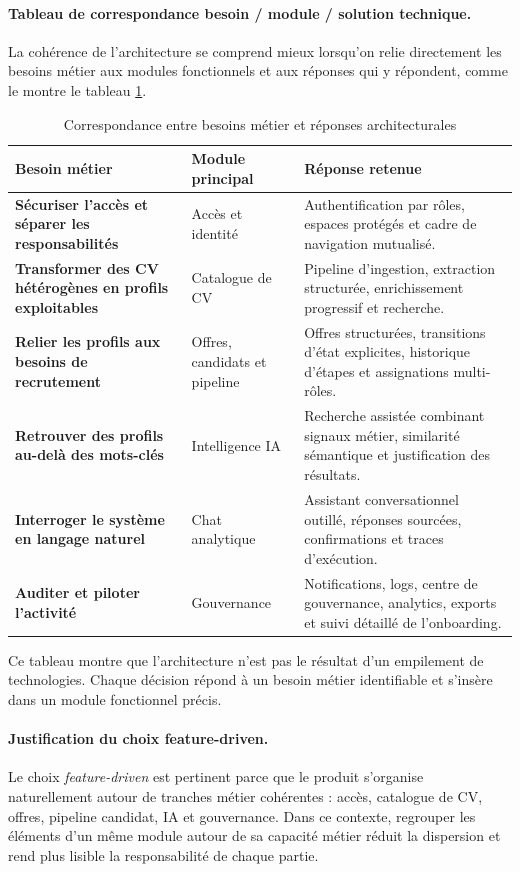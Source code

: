 \paragraph{Tableau de correspondance besoin / module / solution technique.}
La cohérence de l'architecture se comprend mieux lorsqu'on relie directement les besoins métier aux modules fonctionnels et aux réponses qui y répondent, comme le montre le tableau \ref{tab:business-architecture-correspondence}.

\begin{table}[H]
  \centering
  \caption{\label{tab:business-architecture-correspondence}Correspondance entre besoins métier et réponses architecturales}
  \begin{tabularx}{\textwidth}{>{\bfseries}p{3.1cm}p{3.1cm}X}
    \toprule
    Besoin métier & Module principal & Réponse retenue \\
    \midrule
    Sécuriser l'accès et séparer les responsabilités & Accès et identité & Authentification par rôles, espaces protégés et cadre de navigation mutualisé. \\
    Transformer des CV hétérogènes en profils exploitables & Catalogue de CV & Pipeline d'ingestion, extraction structurée, enrichissement progressif et recherche. \\
    Relier les profils aux besoins de recrutement & Offres, candidats et pipeline & Offres structurées, transitions d'état explicites, historique d'étapes et assignations multi-rôles. \\
    Retrouver des profils au-delà des mots-clés & Intelligence IA & Recherche assistée combinant signaux métier, similarité sémantique et justification des résultats. \\
    Interroger le système en langage naturel & Chat analytique & Assistant conversationnel outillé, réponses sourcées, confirmations et traces d'exécution. \\
    Auditer et piloter l'activité & Gouvernance & Notifications, logs, centre de gouvernance, analytics, exports et suivi détaillé de l'onboarding. \\
    \bottomrule
  \end{tabularx}
\end{table}

Ce tableau montre que l'architecture n'est pas le résultat d'un empilement de technologies. Chaque décision répond à un besoin métier identifiable et s'insère dans un module fonctionnel précis.

\paragraph{Justification du choix feature-driven.}
Le choix \textit{feature-driven} est pertinent parce que le produit s'organise naturellement autour de tranches métier cohérentes : accès, catalogue de CV, offres, pipeline candidat, IA et gouvernance. Dans ce contexte, regrouper les éléments d'un même module autour de sa capacité métier réduit la dispersion et rend plus lisible la responsabilité de chaque partie.

